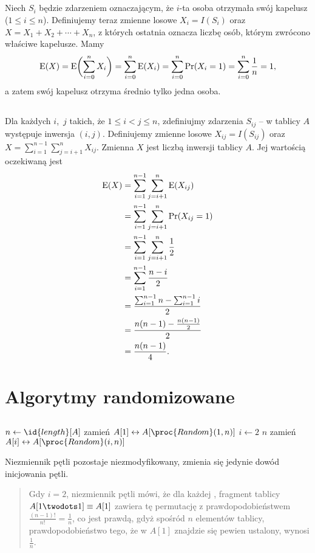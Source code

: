 \subsection{} %
Niech $S_i$ będzie zdarzeniem oznaczającym, że $i$-ta osoba otrzymała swój kapelusz ($1\le i\le n$). Definiujemy teraz zmienne losowe $X_i=I(S_i)$ oraz $X=X_1+X_2+\cdots+X_n$, z których ostatnia oznacza liczbę osób, którym zwrócono właściwe kapelusze. Mamy
\[
	\operatorname{E}(X) = \operatorname{E}\biggl(\sum_{i=0}^nX_i\biggr) = \sum_{i=0}^n\operatorname{E}(X_i) = \sum_{i=0}^n\Pr(X_i=1) = \sum_{i=0}^n\frac{1}{n} = 1,
\]
a zatem swój kapelusz otrzyma średnio tylko jedna osoba.

\subsection{} %
Dla każdych $i$,~$j$ takich, że $1\le i<j\le n$, zdefiniujmy zdarzenia $S_{ij}$ -- w tablicy $A$ występuje inwersja $(i,j)$. Definiujemy zmienne losowe $X_{ij}=I(S_{ij})$ oraz $X=\sum_{i=1}^{n-1}\sum_{j=i+1}^nX_{ij}$. Zmienna $X$ jest liczbą inwersji tablicy $A$. Jej wartością oczekiwaną jest
\begin{align*}
	\operatorname{E}(X) &= \sum_{i=1}^{n-1}\sum_{j=i+1}^n\operatorname{E}(X_{ij}) \\
	&= \sum_{i=1}^{n-1}\sum_{j=i+1}^n\Pr(X_{ij}=1) \\
	&= \sum_{i=1}^{n-1}\sum_{j=i+1}^n\frac{1}{2} \\
	&= \sum_{i=1}^{n-1}\frac{n-i}{2} \\
	&= \frac{\sum_{i=1}^{n-1}n-\sum_{i=1}^{n-1}i}{2} \\
	&= \frac{n(n-1)-\frac{n(n-1)}{2}}{2} \\
	&= \frac{n(n-1)}{4}.
\end{align*}

\section{Algorytmy randomizowane}

\subsection{} %
\begin{codebox}
\li	$n\gets\id{length}[A]$
\li	zamień $A[1]\leftrightarrow A[\proc{Random}(1,n)]$
\li	\For $i\gets2$ \To $n$
\li		\Do
			zamień $A[i]\leftrightarrow A[\proc{Random}(i,n)]$
		\End
\end{codebox}
Niezmiennik pętli pozostaje niezmodyfikowany, zmienia się jedynie dowód inicjowania pętli.
\begin{quote}
	Gdy $i=2$, niezmiennik pętli mówi, że dla każdej , fragment tablicy $A[1\twodots1]\equiv A[1]$ zawiera tę permutację z prawdopodobieństwem $\frac{(n-1)!}{n!}=\frac{1}{n}$, co jest prawdą, gdyż spośród $n$ elementów tablicy, prawdopodobieństwo tego, że w $A[1]$ znajdzie się pewien ustalony, wynosi $\frac{1}{n}$.
\end{quote}

